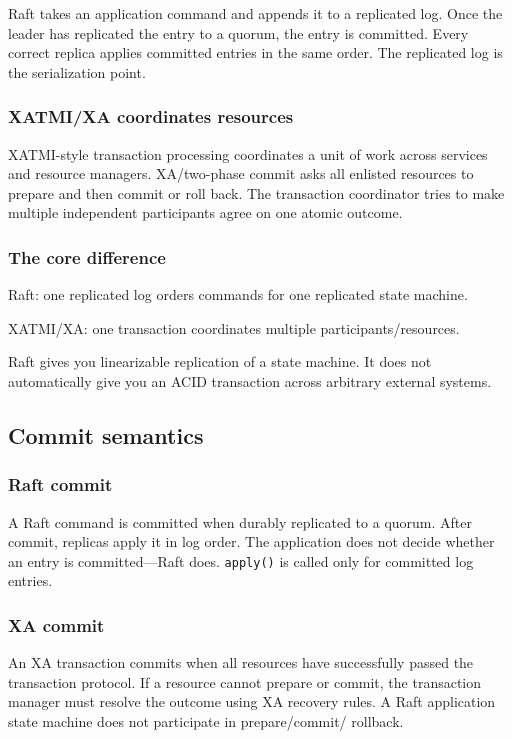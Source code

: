 Raft takes an application command and appends it to a replicated log.
Once the leader has replicated the entry to a quorum, the entry is
committed. Every correct replica applies committed entries in the same
order. The replicated log is the serialization point.

\subsubsection{XATMI/XA coordinates resources}

XATMI-style transaction processing coordinates a unit of work across
services and resource managers. XA/two-phase commit asks all enlisted
resources to prepare and then commit or roll back. The transaction
coordinator tries to make multiple independent participants agree on one
atomic outcome.

\subsubsection{The core difference}

Raft: one replicated log orders commands for one replicated state machine.

XATMI/XA: one transaction coordinates multiple participants/resources.

Raft gives you linearizable replication of a state machine. It does not
automatically give you an ACID transaction across arbitrary external
systems.

\subsection{Commit semantics}

\subsubsection{Raft commit}

A Raft command is committed when durably replicated to a quorum. After
commit, replicas apply it in log order. The application does not decide
whether an entry is committed---Raft does. \texttt{apply()} is called
only for committed log entries.

\subsubsection{XA commit}

An XA transaction commits when all resources have successfully passed the
transaction protocol. If a resource cannot prepare or commit, the
transaction manager must resolve the outcome using XA recovery rules. A
Raft application state machine does not participate in prepare/commit/
rollback.

